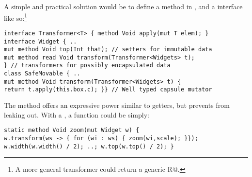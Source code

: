 
A simple and practical solution would be to define a \Q@transform@ method in \Q@Widget@, and a \Q@Transformer@ interface 
like so:\footnote{A more general transformer could return a generic \Q@read R@.}
\begin{lstlisting}
interface Transformer<T> { method Void apply(mut T elem); }
interface Widget { ..
mut method Void top(Int that); // setters for immutable data
mut method read Void transform(Transformer<Widgets> t);
} // transformers for possibly encapsulated data
class SafeMovable { ..
mut method Void transform(Transformer<Widgets> t) {
return t.apply(this.box.c); }} // Well typed capsule mutator
\end{lstlisting}\saveSpace
The \Q@transform@ method offers an expressive power similar to \Q@mut@ getters, but prevents \Q@Widgets@ from leaking out.  With a \Q@Transformer@, a \Q@zoom@ function could be simply:
\begin{lstlisting}
static method Void zoom(mut Widget w) {
w.transform(ws -> { for (wi : ws) { zoom(wi,scale); }});
w.width(w.width() / 2); ..; w.top(w.top() / 2); }
\end{lstlisting}



